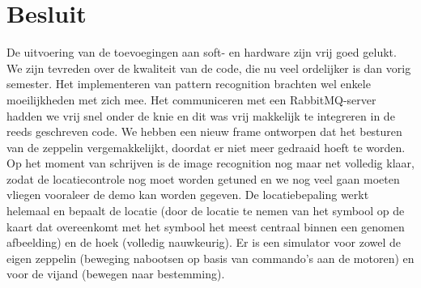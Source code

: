 \documentclass[eind]{penoverslag}
\begin{document}
\section{Besluit}
De uitvoering van de toevoegingen aan soft- en hardware zijn vrij goed gelukt. We zijn tevreden over de kwaliteit van de code, die nu veel ordelijker is dan vorig semester. Het implementeren van pattern recognition brachten wel enkele moeilijkheden met zich mee. Het communiceren met een RabbitMQ-server hadden we vrij snel onder de knie en dit was vrij makkelijk te integreren in de reeds geschreven code. We hebben een nieuw frame ontworpen dat het besturen van de zeppelin vergemakkelijkt, doordat er niet meer gedraaid hoeft te worden. Op het moment van schrijven is de image recognition nog maar net volledig klaar, zodat de locatiecontrole nog moet worden getuned en we nog veel gaan moeten vliegen vooraleer de demo kan worden gegeven. De locatiebepaling werkt helemaal en bepaalt de locatie (door de locatie te nemen van het symbool op de kaart dat overeenkomt met het symbool het meest centraal binnen een genomen afbeelding) en de hoek (volledig nauwkeurig). Er is een simulator voor zowel de eigen zeppelin (beweging nabootsen op basis van commando's aan de motoren) en voor de vijand (bewegen naar bestemming).


\newpage\makeappendix
\end{document}
